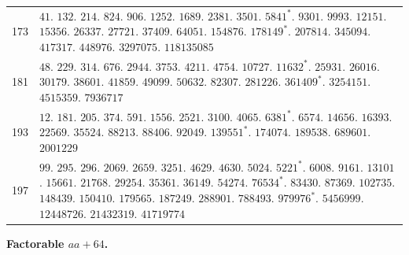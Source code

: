 \begin{longtable}{@{}r|p{\dimexpr\linewidth-38pt\relax}@{}}
173 & $41$. $132$. $214$. $824$. $906$. $1252$. $1689$. $2381$. $3501$. $5841^{*}$. $9301$. $9993$. $12151$. $15356$. $26337$. $27721$. $37409$. $64051$. $154876$. $178149^{*}$. $207814$. $345094$. $417317$. $448976$. $3297075$. $118135085$\\
181 & $48$. $229$. $314$. $676$. $2944$. $3753$. $4211$. $4754$. $10727$. $11632^{*}$. $25931$. $26016$. $30179$. $38601$. $41859$. $49099$. $50632$. $82307$. $281226$. $361409^{*}$. $3254151$. $4515359$. $7936717$\\
193 & $12$. $181$. $205$. $374$. $591$. $1556$. $2521$. $3100$. $4065$. $6381^{*}$. $6574$. $14656$. $16393$. $22569$. $35524$. $88213$. $88406$. $92049$. $139551^{*}$. $174074$. $189538$. $689601$. $2001229$\\
197 & $99$. $295$. $296$. $2069$. $2659$. $3251$. $4629$. $4630$. $5024$. $5221^{*}$. $6008$. $9161$. $13101$. $15661$. $21768$. $29254$. $35361$. $36149$. $54274$. $76534^{*}$. $83430$. $87369$. $102735$. $148439$. $150410$. $179565$. $187249$. $288901$. $788493$. $979976^{*}$. $5456999$. $12448726$. $21432319$. $41719774$\\
\end{longtable}\endgroup
\par{}
\begin{center}\textbf{Factorable $aa+64$.}\end{center}
\begingroup\small\setlength{\tabcolsep}{5pt}
